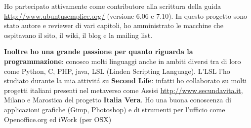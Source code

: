 \documentclass[totpages,helvetica,openbib,italian]{europecv}
\begin{document}
\begin{europecv}
{Ho partecipato attivamente come contributore alla scrittura della guida \url{http://www.ubuntusemplice.org/} (versione 6.06 e 7.10). In questo progetto sono stato autore e reviewer di vari capitoli, ho amministrato le macchine che ospitavano il sito, il wiki, il blog e la mailing list.

\textbf{Inoltre ho una grande passione per quanto riguarda la programmazione}: conosco molti linguaggi anche in ambiti diversi tra di loro come Python, C, PHP, java, LSL (Linden Scripting Language). L'LSL l'ho studiato durante la mia attivit\'a su \textbf{Second Life}: infatti ho collaborato su molti progetti italiani presenti nel metaverso come Assisi \url{http://www.secundavita.it}, Milano e Marostica del progetto \textbf{Italia Vera}.
Ho una buona conoscenza di applicazioni grafiche (Gimp, Photoshop) e di strumenti per l'ufficio come Openoffice.org ed iWork (per OSX)}






\end{europecv}
\end{document}
